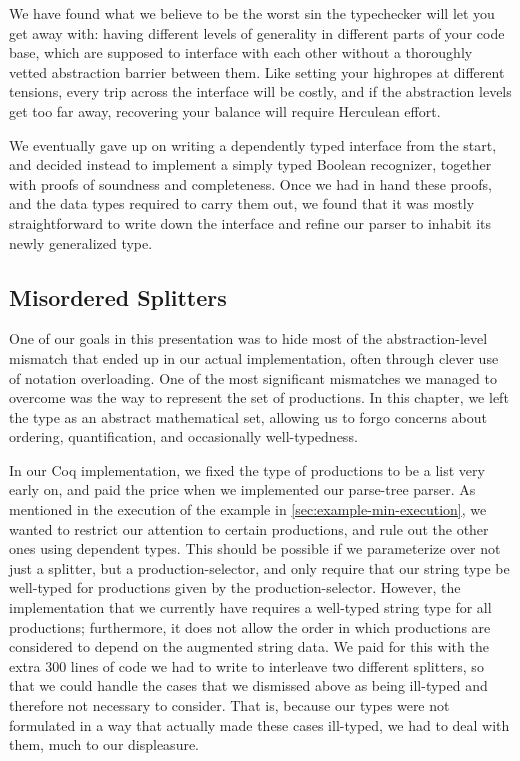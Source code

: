     We have found what we believe to be the worst sin the typechecker will let you get away with: having different levels of generality in different parts of your code base, which are supposed to interface with each other without a thoroughly vetted abstraction barrier between them.  Like setting your highropes at different tensions, every trip across the interface will be costly, and if the abstraction levels get too far away, recovering your balance will require Herculean effort.

    We eventually gave up on writing a dependently typed interface from the start, and decided instead to implement a simply typed Boolean recognizer, together with proofs of soundness and completeness.  Once we had in hand these proofs, and the data types required to carry them out, we found that it was mostly straightforward to write down the interface and refine our parser to inhabit its newly generalized type.

  \subsection{Misordered Splitters} \label{sec:misordered-splitters}
    One of our goals in this presentation was to hide most of the abstraction-level mismatch that ended up in our actual implementation, often through clever use of notation overloading.  One of the most significant mismatches we managed to overcome was the way to represent the set of productions.  In this chapter, we left the type as an abstract mathematical set, allowing us to forgo concerns about ordering, quantification, and occasionally well-typedness.

    In our Coq implementation, we fixed the type of productions to be a list very early on, and paid the price when we implemented our parse-tree parser.  As mentioned in the execution of the example in \autoref{sec:example-min-execution}, we wanted to restrict our attention to certain productions, and rule out the other ones using dependent types.  This should be possible if we parameterize over not just a splitter, but a production-selector, and only require that our string type be well-typed for productions given by the production-selector.  However, the implementation that we currently have requires a well-typed string type for all productions; furthermore, it does not allow the order in which productions are considered to depend on the augmented string data.  We paid for this with the extra 300 lines of code we had to write to interleave two different splitters, so that we could handle the cases that we dismissed above as being ill-typed and therefore not necessary to consider.  That is, because our types were not formulated in a way that actually made these cases ill-typed, we had to deal with them, much to our displeasure.

